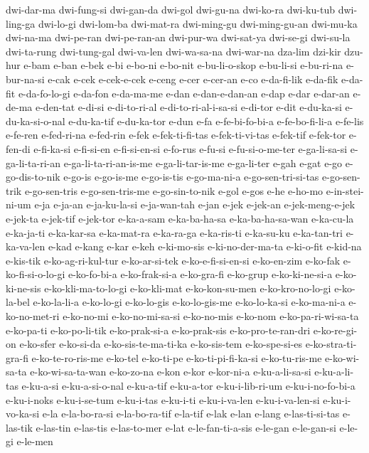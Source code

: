 {dwi-dar-ma dwi-fung-si dwi-gan-da dwi-gol dwi-gu-na dwi-ko-ra dwi-ku-tub
dwi-ling-ga dwi-lo-gi dwi-lom-ba dwi-mat-ra dwi-ming-gu dwi-ming-gu-an
dwi-mu-ka dwi-na-ma dwi-pe-ran dwi-pe-ran-an dwi-pur-wa dwi-sat-ya
dwi-se-gi dwi-su-la dwi-ta-rung dwi-tung-gal dwi-va-len dwi-wa-sa-na
dwi-war-na dza-lim dzi-kir dzu-hur e-bam e-ban e-bek e-bi e-bo-ni e-bo-nit
e-bu-li-o-skop e-bu-li-si e-bu-ri-na e-bur-na-si e-cak e-cek e-cek-e-cek
e-ceng e-cer e-cer-an e-co e-da-fi-lik e-da-fik e-da-fit e-da-fo-lo-gi
e-da-fon e-da-ma-me e-dan e-dan-e-dan-an e-dap e-dar e-dar-an e-de-ma
e-den-tat e-di-si e-di-to-ri-al e-di-to-ri-al-i-sa-si e-di-tor e-dit
e-du-ka-si e-du-ka-si-o-nal e-du-ka-tif e-du-ka-tor e-dun e-fa
e-fe-bi-fo-bi-a e-fe-bo-fi-li-a e-fe-lis e-fe-ren e-fed-ri-na e-fed-rin
e-fek e-fek-ti-fi-tas e-fek-ti-vi-tas e-fek-tif e-fek-tor e-fen-di
e-fi-ka-si e-fi-si-en e-fi-si-en-si e-fo-rus e-fu-si e-fu-si-o-me-ter
e-ga-li-sa-si e-ga-li-ta-ri-an e-ga-li-ta-ri-an-is-me e-ga-li-tar-is-me
e-ga-li-ter e-gah e-gat e-go e-go-dis-to-nik e-go-is e-go-is-me
e-go-is-tis e-go-ma-ni-a e-go-sen-tri-si-tas e-go-sen-trik e-go-sen-tris
e-go-sen-tris-me e-go-sin-to-nik e-gol e-gos e-he e-ho-mo e-in-stei-ni-um
e-ja e-ja-an e-ja-ku-la-si e-ja-wan-tah e-jan e-jek e-jek-an
e-jek-meng-e-jek e-jek-ta e-jek-tif e-jek-tor e-ka-a-sam e-ka-ba-ha-sa
e-ka-ba-ha-sa-wan e-ka-cu-la e-ka-ja-ti e-ka-kar-sa e-ka-mat-ra e-ka-ra-ga
e-ka-ris-ti e-ka-su-ku e-ka-tan-tri e-ka-va-len e-kad e-kang e-kar e-keh
e-ki-mo-sis e-ki-no-der-ma-ta e-ki-o-fit e-kid-na e-kis-tik
e-ko-ag-ri-kul-tur e-ko-ar-si-tek e-ko-e-fi-si-en-si e-ko-en-zim e-ko-fak
e-ko-fi-si-o-lo-gi e-ko-fo-bi-a e-ko-frak-si-a e-ko-gra-fi e-ko-grup
e-ko-ki-ne-si-a e-ko-ki-ne-sis e-ko-kli-ma-to-lo-gi e-ko-kli-mat
e-ko-kon-su-men e-ko-kro-no-lo-gi e-ko-la-bel e-ko-la-li-a e-ko-lo-gi
e-ko-lo-gis e-ko-lo-gis-me e-ko-lo-ka-si e-ko-ma-ni-a e-ko-no-met-ri
e-ko-no-mi e-ko-no-mi-sa-si e-ko-no-mis e-ko-nom e-ko-pa-ri-wi-sa-ta
e-ko-pa-ti e-ko-po-li-tik e-ko-prak-si-a e-ko-prak-sis e-ko-pro-te-ran-dri
e-ko-re-gi-on e-ko-sfer e-ko-si-da e-ko-sis-te-ma-ti-ka e-ko-sis-tem
e-ko-spe-si-es e-ko-stra-ti-gra-fi e-ko-te-ro-ris-me e-ko-tel e-ko-ti-pe
e-ko-ti-pi-fi-ka-si e-ko-tu-ris-me e-ko-wi-sa-ta e-ko-wi-sa-ta-wan
e-ko-zo-na e-kon e-kor e-kor-ni-a e-ku-a-li-sa-si e-ku-a-li-tas e-ku-a-si
e-ku-a-si-o-nal e-ku-a-tif e-ku-a-tor e-ku-i-lib-ri-um e-ku-i-no-fo-bi-a
e-ku-i-noks e-ku-i-se-tum e-ku-i-tas e-ku-i-ti e-ku-i-va-len
e-ku-i-va-len-si e-ku-i-vo-ka-si e-la e-la-bo-ra-si e-la-bo-ra-tif
e-la-tif e-lak e-lan e-lang e-las-ti-si-tas e-las-tik e-las-tin e-las-tis
e-las-to-mer e-lat e-le-fan-ti-a-sis e-le-gan e-le-gan-si e-le-gi e-le-men
}
